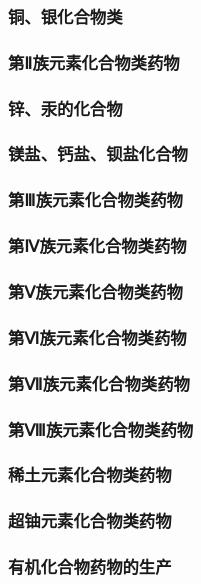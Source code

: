 \documentclass[UTF8]{../../ApplicationUniverse}
\begin{document}
        \subsubsection{铜、银化合物类}
    \subsubsection{第Ⅱ族元素化合物类药物}
        \subsubsection{锌、汞的化合物}
        \subsubsection{镁盐、钙盐、钡盐化合物}
    \subsubsection{第Ⅲ族元素化合物类药物}
    \subsubsection{第Ⅳ族元素化合物类药物}
    \subsubsection{第Ⅴ族元素化合物类药物}
    \subsubsection{第Ⅵ族元素化合物类药物}
    \subsubsection{第Ⅶ族元素化合物类药物}
    \subsubsection{第Ⅷ族元素化合物类药物}
        \subsubsection{稀土元素化合物类药物}
        \subsubsection{超铀元素化合物类药物}
\subsubsection{有机化合物药物的生产}
\end{document}
